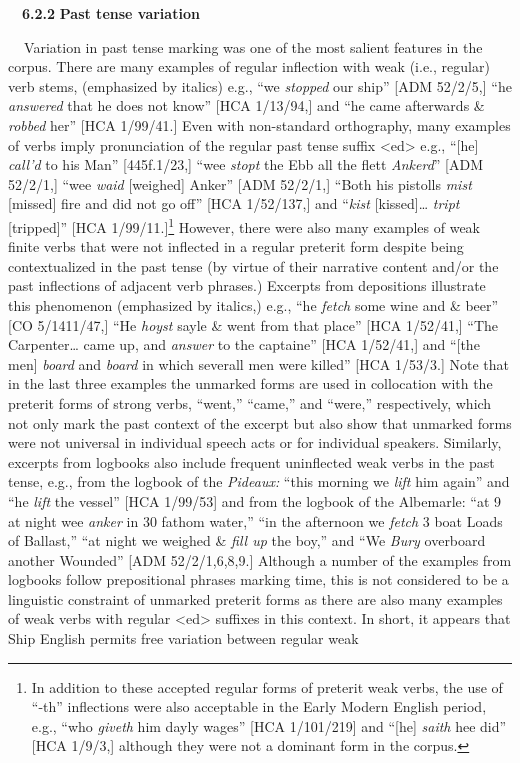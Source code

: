\documentclass[12pt]{article}
\newenvironment{styleStandard}{\renewcommand\baselinestretch{1.0}\setlength\leftskip{0cm}\setlength\rightskip{0cm plus 1fil}\setlength\parindent{0cm}\setlength\parfillskip{0pt plus 1fil}\setlength\parskip{0in plus 1pt}\writerlistparindent\writerlistleftskip\leavevmode\normalfont\normalsize\writerlistlabel\ignorespaces}{\unskip\vspace{0in plus 1pt}\par}
\newcommand\writerlistleftskip{}
\newcommand\writerlistparindent{}
\newcommand\writerlistlabel{}
\begin{document}
\begin{styleStandard}
\ \ \textbf{6.2.2} \textbf{Past tense variation }
\end{styleStandard}


\begin{styleStandard}
\textbf{\ \ }Variation in past tense marking was one of the most salient features in the corpus. There are many examples of regular inflection with weak (i.e., regular) verb stems, (emphasized by italics) e.g., “we \textit{stopped} our ship” [ADM 52/2/5,] “he \textit{answered} that he does not know” [HCA 1/13/94,] and “he came afterwards \&\textit{ robbed} her” [HCA 1/99/41.] Even with non-standard orthography, many examples of verbs imply pronunciation of the regular past tense suffix {\textless}ed{\textgreater} e.g., “[he] \textit{call’d} to his Man” [445f.1/23,] “wee \textit{stopt} the Ebb all the flett \textit{Ankerd}” [ADM 52/2/1,] “wee \textit{waid} [weighed] Anker” [ADM 52/2/1,] “Both his pistolls \textit{mist} [missed] fire and did not go off” [HCA 1/52/137,] and “\textit{kist} [kissed]… \textit{tript} [tripped]” [HCA 1/99/11.]\footnote{ In addition to these accepted regular forms of preterit weak verbs, the use of “-th” inflections were also acceptable in the Early Modern English period, e.g., “who \textit{giveth} him dayly wages” [HCA 1/101/219] and “[he] \textit{saith} hee did” [HCA 1/9/3,] although they were not a dominant form in the corpus.} However, there were also many examples of weak finite verbs that were not inflected in a regular preterit form despite being contextualized in the past tense (by virtue of their narrative content and/or the past inflections of adjacent verb phrases.) Excerpts from depositions illustrate this phenomenon (emphasized by italics,) e.g., “he \textit{fetch} some wine and \& beer” [CO 5/1411/47,] “He \textit{hoyst }sayle \& went from that place” [HCA 1/52/41,] “The Carpenter… came up, and \textit{answer} to the captaine” [HCA 1/52/41,] and “[the men] \textit{board} and\textit{ board} in which severall men were killed” [HCA 1/53/3.] Note that in the last three examples the unmarked forms are used in collocation with the preterit forms of strong verbs, “went,” “came,” and “were,” respectively, which not only mark the past context of the excerpt but also show that unmarked forms were not universal in individual speech acts or for individual speakers. Similarly, excerpts from logbooks also include frequent uninflected weak verbs in the past tense, e.g., from the logbook of the \textit{Pideaux: }“this morning we\textit{ lift} him again” and “he \textit{lift} the vessel” [HCA 1/99/53] and from the logbook of the Albemarle: “at 9 at night wee \textit{anker }in 30 fathom water,” “in the afternoon we \textit{fetch} 3 boat Loads of Ballast,” “at night we weighed \& \textit{fill up} the boy,” and “We\textit{ Bury} overboard another Wounded” [ADM 52/2/1,6,8,9.] Although a number of the examples from logbooks follow prepositional phrases marking time, this is not considered to be a linguistic constraint of unmarked preterit forms as there are also many examples of weak verbs with regular {\textless}ed{\textgreater} suffixes in this context. In short, it appears that Ship English permits free variation between regular weak 
\end{styleStandard}
\end{document}

